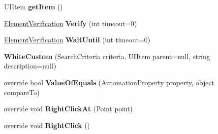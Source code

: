\begin{DoxyCompactItemize}
\item 
\hypertarget{class_proto_test_1_1_golem_1_1_white_1_1_elements_1_1_white_custom_ad27de67d079374003c819e312b88a672}{U\-I\-Item {\bfseries get\-Item} ()}\label{class_proto_test_1_1_golem_1_1_white_1_1_elements_1_1_white_custom_ad27de67d079374003c819e312b88a672}

\item 
\hypertarget{class_proto_test_1_1_golem_1_1_white_1_1_elements_1_1_white_custom_a5a84914d0441280ab85bbdd5200b6726}{\hyperlink{class_proto_test_1_1_golem_1_1_white_1_1_element_verification}{Element\-Verification} {\bfseries Verify} (int timeout=0)}\label{class_proto_test_1_1_golem_1_1_white_1_1_elements_1_1_white_custom_a5a84914d0441280ab85bbdd5200b6726}

\item 
\hypertarget{class_proto_test_1_1_golem_1_1_white_1_1_elements_1_1_white_custom_a3a132847d8d7773911ce7f58f0ea24a2}{\hyperlink{class_proto_test_1_1_golem_1_1_white_1_1_element_verification}{Element\-Verification} {\bfseries Wait\-Until} (int timeout=0)}\label{class_proto_test_1_1_golem_1_1_white_1_1_elements_1_1_white_custom_a3a132847d8d7773911ce7f58f0ea24a2}

\item 
\hypertarget{class_proto_test_1_1_golem_1_1_white_1_1_elements_1_1_white_custom_abd301c86196e70580bbeff7721fc45bb}{{\bfseries White\-Custom} (Search\-Criteria criteria, U\-I\-Item parent=null, string description=null)}\label{class_proto_test_1_1_golem_1_1_white_1_1_elements_1_1_white_custom_abd301c86196e70580bbeff7721fc45bb}

\item 
\hypertarget{class_proto_test_1_1_golem_1_1_white_1_1_elements_1_1_white_custom_abcd9a10fba4500941075f2812a0f5ca1}{override bool {\bfseries Value\-Of\-Equals} (Automation\-Property property, object compare\-To)}\label{class_proto_test_1_1_golem_1_1_white_1_1_elements_1_1_white_custom_abcd9a10fba4500941075f2812a0f5ca1}

\item 
\hypertarget{class_proto_test_1_1_golem_1_1_white_1_1_elements_1_1_white_custom_aea1e747f936ab9762f60993de44c346d}{override void {\bfseries Right\-Click\-At} (Point point)}\label{class_proto_test_1_1_golem_1_1_white_1_1_elements_1_1_white_custom_aea1e747f936ab9762f60993de44c346d}

\item 
\hypertarget{class_proto_test_1_1_golem_1_1_white_1_1_elements_1_1_white_custom_a6d0900906d96299fb2b13d71ef93882c}{override void {\bfseries Right\-Click} ()}\label{class_proto_test_1_1_golem_1_1_white_1_1_elements_1_1_white_custom_a6d0900906d96299fb2b13d71ef93882c}


\end{DoxyCompactItemize}
